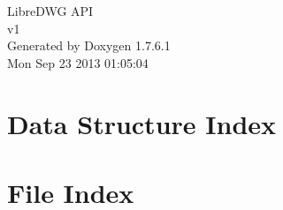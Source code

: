 \documentclass[a4paper]{book}
\begin{document}
\hypersetup{pageanchor=false,citecolor=blue}
\begin{titlepage}
\vspace*{7cm}
\begin{center}
{\Large \-Libre\-D\-W\-G \-A\-P\-I \\[1ex]\large v1 }\\
\vspace*{1cm}
{\large \-Generated by Doxygen 1.7.6.1}\\
\vspace*{0.5cm}
{\small Mon Sep 23 2013 01:05:04}\\
\end{center}
\end{titlepage}
\clearemptydoublepage
{}
\tableofcontents
\clearemptydoublepage
{}
\hypersetup{pageanchor=true,citecolor=blue}
\chapter{\-Data \-Structure \-Index}

\chapter{\-File \-Index}

\end{document}
